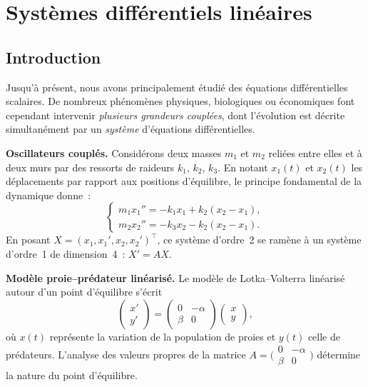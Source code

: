 \documentclass[12pt,a4paper,openany]{book}
\theoremstyle{definition}
\theoremstyle{plain}
\theoremstyle{remark}
\begin{document}

\chapter{Systèmes différentiels linéaires}\label{ch:systemes-lineaires}

\minitoc
\vspace{1cm}

\section*{Introduction}

Jusqu'à présent, nous avons principalement étudié des équations
différentielles scalaires. De nombreux phénomènes physiques, biologiques
ou économiques font cependant intervenir \emph{plusieurs grandeurs couplées},
dont l'évolution est décrite simultanément par un \emph{système}
d'équations différentielles.

\medskip

\noindent\textbf{Oscillateurs couplés.}
Considérons deux masses $m_1$ et $m_2$ reliées entre elles et à deux
murs par des ressorts de raideurs $k_1$, $k_2$, $k_3$. En notant
$x_1(t)$ et $x_2(t)$ les déplacements par rapport aux positions
d'équilibre, le principe fondamental de la dynamique donne~:
\[
\begin{cases}
m_1 x_1'' = -k_1 x_1 + k_2(x_2 - x_1), \\
m_2 x_2'' = -k_3 x_2 - k_2(x_2 - x_1).
\end{cases}
\]
En posant $X = (x_1, x_1', x_2, x_2')^\top$, ce système d'ordre~2 se
ramène à un système d'ordre~1 de dimension~4~: $X' = AX$.

\medskip

\noindent\textbf{Modèle proie--prédateur linéarisé.}
Le modèle de Lotka--Volterra linéarisé autour d'un point d'équilibre
s'écrit
\[
\begin{pmatrix} x' \\ y' \end{pmatrix}
= \begin{pmatrix} 0 & -\alpha \\ \beta & 0 \end{pmatrix}
  \begin{pmatrix} x \\ y \end{pmatrix},
\]
où $x(t)$ représente la variation de la population de proies et $y(t)$
celle de prédateurs. L'analyse des valeurs propres de la matrice
$A = \bigl(\begin{smallmatrix} 0 & -\alpha \\ \beta & 0 \end{smallmatrix}\bigr)$
détermine la nature du point d'équilibre.
\end{document}
